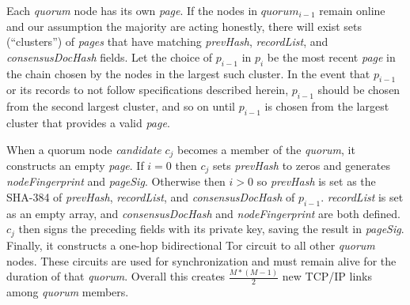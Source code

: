 Each \emph{quorum} node has its own \emph{page}. If the nodes in $ quorum_{i - 1} $ remain online and our assumption the majority are acting honestly, there will exist sets (``clusters'') of \emph{pages} that have matching \emph{prevHash}, \emph{recordList}, and \emph{consensusDocHash} fields. Let the choice of $ p_{i - 1} $ in $ p_{i} $ be the most recent \emph{page} in the chain chosen by the nodes in the largest such cluster. In the event that $ p_{i - 1} $ or its records to not follow specifications described herein, $ p_{i - 1} $ should be chosen from the second largest cluster, and so on until $ p_{i - 1} $ is chosen from the largest cluster that provides a valid \emph{page}.

When a quorum node \emph{candidate} $ c_{j} $ becomes a member of the \emph{quorum}, it constructs an empty \emph{page}. If $ i = 0 $ then $ c_{j} $ sets \emph{prevHash} to zeros and generates \emph{nodeFingerprint} and \emph{pageSig}. Otherwise then $ i > 0 $ so \emph{prevHash} is set as the SHA-384 of \emph{prevHash}, \emph{recordList}, and \emph{consensusDocHash} of $ p_{i - 1} $. \emph{recordList} is set as an empty array, and \emph{consensusDocHash} and \emph{nodeFingerprint} are both defined. $ c_{j} $ then signs the preceding fields with its private key, saving the result in \emph{pageSig}. Finally, it constructs a one-hop bidirectional Tor circuit to all other \emph{quorum} nodes. These circuits are used for synchronization and must remain alive for the duration of that \emph{quorum}. Overall this creates $ \frac{M * (M - 1)}{2} $ new TCP/IP links among \emph{quorum} members.

